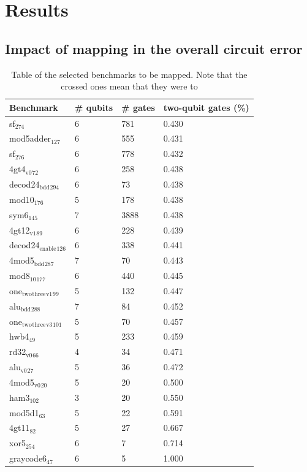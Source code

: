 
\chapter*{Results}
\label{sec:orgf38b310}

\section*{Impact of mapping in the overall circuit error}
\label{sec:org0d1f74c}

\begin{table}[htbp]
\caption{Table of the selected benchmarks to be mapped. Note that the crossed ones mean that they were to}
\centering
\small
\begin{tabular}{llll}
\hline
Benchmark & \# qubits & \# gates & two-qubit gates (\%)\\
\hline
sf\(_{\text{274}}\) & 6 & 781 & 0.430\\
mod5adder\(_{\text{127}}\) & 6 & 555 & 0.431\\
sf\(_{\text{276}}\) & 6 & 778 & 0.432\\
4gt4\(_{\text{v0}}\)\(_{\text{72}}\) & 6 & 258 & 0.438\\
decod24\(_{\text{bdd}}\)\(_{\text{294}}\) & 6 & 73 & 0.438\\
mod10\(_{\text{176}}\) & 5 & 178 & 0.438\\
sym6\(_{\text{145}}\) & 7 & 3888 & 0.438\\
4gt12\(_{\text{v1}}\)\(_{\text{89}}\) & 6 & 228 & 0.439\\
decod24\(_{\text{enable}}\)\(_{\text{126}}\) & 6 & 338 & 0.441\\
4mod5\(_{\text{bdd}}\)\(_{\text{287}}\) & 7 & 70 & 0.443\\
mod8\(_{\text{10}}\)\(_{\text{177}}\) & 6 & 440 & 0.445\\
one\(_{\text{two}}\)\(_{\text{three}}\)\(_{\text{v1}}\)\(_{\text{99}}\) & 5 & 132 & 0.447\\
alu\(_{\text{bdd}}\)\(_{\text{288}}\) & 7 & 84 & 0.452\\
one\(_{\text{two}}\)\(_{\text{three}}\)\(_{\text{v3}}\)\(_{\text{101}}\) & 5 & 70 & 0.457\\
hwb4\(_{\text{49}}\) & 5 & 233 & 0.459\\
rd32\(_{\text{v0}}\)\(_{\text{66}}\) & 4 & 34 & 0.471\\
alu\(_{\text{v0}}\)\(_{\text{27}}\) & 5 & 36 & 0.472\\
4mod5\(_{\text{v0}}\)\(_{\text{20}}\) & 5 & 20 & 0.500\\
ham3\(_{\text{102}}\) & 3 & 20 & 0.550\\
mod5d1\(_{\text{63}}\) & 5 & 22 & 0.591\\
4gt11\(_{\text{82}}\) & 5 & 27 & 0.667\\
xor5\(_{\text{254}}\) & 6 & 7 & 0.714\\
graycode6\(_{\text{47}}\) & 6 & 5 & 1.000\\
\hline
\end{tabular}
\end{table}

